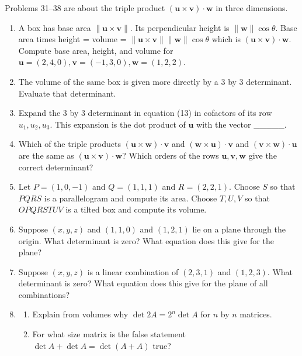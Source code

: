 \documentclass[14pt, a4paper]{article}
\begin{document}
\noindent Problems 31--38 are about the triple product $(\boldsymbol{u} \times \boldsymbol{v}) \cdot \boldsymbol{w}$ in three dimensions.

\begin{enumerate}[resume]
    \item A box has base area $\|\boldsymbol{u} \times \boldsymbol{v}\|$. Its perpendicular height is $\|\boldsymbol{w}\| \cos \theta$. Base area times height = volume = $\|\boldsymbol{u} \times \boldsymbol{v}\| \|\boldsymbol{w}\| \cos \theta$ which is $(\boldsymbol{u} \times \boldsymbol{v}) \cdot \boldsymbol{w}$. Compute base area, height, and volume for $\boldsymbol{u} = (2, 4, 0), \boldsymbol{v} = (-1, 3, 0), \boldsymbol{w} = (1, 2, 2)$.

    \item The volume of the same box is given more directly by a 3 by 3 determinant. Evaluate that determinant.

    \item Expand the 3 by 3 determinant in equation (13) in cofactors of its row $u_1, u_2, u_3$. This expansion is the dot product of $\boldsymbol{u}$ with the vector \_\_\_\_\_.

    \item Which of the triple products $(\boldsymbol{u} \times \boldsymbol{w}) \cdot \boldsymbol{v}$ and $(\boldsymbol{w} \times \boldsymbol{u}) \cdot \boldsymbol{v}$ and $(\boldsymbol{v} \times \boldsymbol{w}) \cdot \boldsymbol{u}$ are the same as $(\boldsymbol{u} \times \boldsymbol{v}) \cdot \boldsymbol{w}$? Which orders of the rows $\boldsymbol{u}, \boldsymbol{v}, \boldsymbol{w}$ give the correct determinant?

    \item Let $P = (1, 0, -1)$ and $Q = (1, 1, 1)$ and $R = (2, 2, 1)$. Choose $S$ so that $PQRS$ is a parallelogram and compute its area. Choose $T, U, V$ so that $OPQRSTUV$ is a tilted box and compute its volume.

    \item Suppose $(x, y, z)$ and $(1, 1, 0)$ and $(1, 2, 1)$ lie on a plane through the origin. What determinant is zero? What equation does this give for the plane?

    \item Suppose $(x, y, z)$ is a linear combination of $(2, 3, 1)$ and $(1, 2, 3)$. What determinant is zero? What equation does this give for the plane of all combinations?

    \item
          \begin{enumerate}
              \item Explain from volumes why $\det 2A = 2^n \det A$ for $n$ by $n$ matrices.
              \item For what size matrix is the false statement $\det A + \det A = \det(A + A)$ true?
          \end{enumerate}
\end{enumerate}
\end{document}
